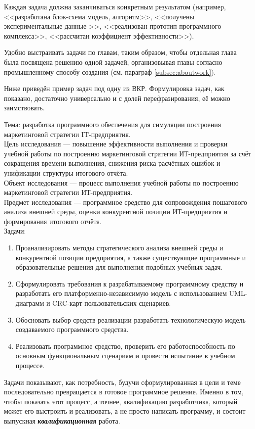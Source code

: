 Каждая задача должна заканчиваться конкретным результатом (например, <<разработана блок-схема модель, алгоритм>>, <<получены экспериментальные данные >>, <<реализован прототип программного комплекса>>, <<рассчитан коэффициент эффективности>>).

Удобно выстраивать задачи по главам, таким образом, чтобы отдельная глава была посвящена решению одной задачей, организовывая главы согласно промышленному способу создания (см. параграф \ref{subsec:aboutwork}).

Ниже приведён пример задач под одну из ВКР. Формулировка задач, как показано, достаточно универсально и с долей перефразирования, её можно заимствовать.

Тема: разработка программного обеспечения для симуляции
построения маркетинговой стратегии IT-предприятия. \\
Цель исследования --- повышение эффективности выполнения и проверки
учебной работы по построению маркетинговой стратегии ИТ-предприятия за счёт
сокращения времени выполнения, снижения риска расчётных ошибок и унификации
структуры итогового отчёта. \\
Объект исследования --- процесс выполнения учебной работы по построению
маркетинговой стратегии ИТ-предприятия.\\
Предмет исследования --- программное средство для сопровождения пошагового
анализа внешней среды, оценки конкурентной позиции ИТ-предприятия и
формирования итогового отчёта.\\
\needspace{\baselineskip}\noindent Задачи:%
\begin{enumerate}
	\item  Проанализировать методы стратегического анализа внешней среды и конкурентной позиции предприятия, а также существующие программные и
	образовательные решения для выполнения подобных учебных задач.
	\item Сформулировать требования к разрабатываемому программному средству и
	разработать его платформенно-независимую модель с использованием UML-диаграмм и
	CRC-карт пользовательских сценариев.
	\item Обосновать выбор средств реализации  разработать технологическую модель создаваемого программного средства.
	\item Реализовать программное средство, проверить его работоспособность по
	основным функциональным сценариям и провести испытание в учебном
	процессе.
\end{enumerate}

Задачи показывают, как потребность, будучи сформулированная в цели и теме последовательно превращается в готовое программное решение. Именно в том, чтобы показать этот процесс, а точнее, квалификацию разработчика, который может его выстроить и реализовать, а не просто написать программу, и состоит выпускная \textbf{\textit{квалификационная}} работа.


